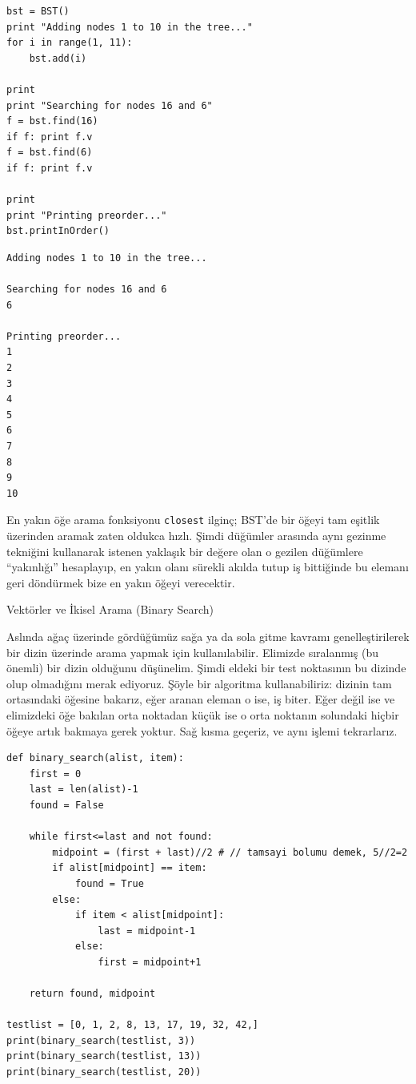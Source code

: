 \documentclass[12pt,fleqn]{article}\usepackage{../../common}
\begin{document}
\begin{verbatim}
bst = BST()
print "Adding nodes 1 to 10 in the tree..."
for i in range(1, 11):
    bst.add(i)

print
print "Searching for nodes 16 and 6"
f = bst.find(16)
if f: print f.v
f = bst.find(6)
if f: print f.v

print
print "Printing preorder..."
bst.printInOrder()
\end{verbatim}

\begin{verbatim}
Adding nodes 1 to 10 in the tree...

Searching for nodes 16 and 6
6

Printing preorder...
1 
2 
3 
4 
5 
6 
7 
8 
9 
10 
\end{verbatim}

En yakın öğe arama fonksiyonu \verb!closest! ilginç; BST'de bir öğeyi tam
eşitlik üzerinden aramak zaten oldukca hızlı. Şimdi düğümler arasında aynı
gezinme tekniğini kullanarak istenen yaklaşık bir değere olan o gezilen
düğümlere ``yakınlığı'' hesaplayıp, en yakın olanı sürekli akılda tutup iş
bittiğinde bu elemanı geri döndürmek bize en yakın öğeyi verecektir. 

Vektörler ve İkisel Arama (Binary Search)

Aslında ağaç üzerinde gördüğümüz sağa ya da sola gitme kavramı
genelleştirilerek bir dizin üzerinde arama yapmak için
kullanılabilir. Elimizde sıralanmış (bu önemli) bir dizin olduğunu
düşünelim. Şimdi eldeki bir test noktasının bu dizinde olup olmadığını
merak ediyoruz. Şöyle bir algoritma kullanabiliriz: dizinin tam ortasındaki
öğesine bakarız, eğer aranan eleman o ise, iş biter. Eğer değil ise ve
elimizdeki öğe bakılan orta noktadan küçük ise o orta noktanın solundaki
hiçbir öğeye artık bakmaya gerek yoktur. Sağ kısma geçeriz, ve aynı işlemi
tekrarlarız. 

\begin{verbatim}
def binary_search(alist, item):
    first = 0
    last = len(alist)-1
    found = False

    while first<=last and not found:
        midpoint = (first + last)//2 # // tamsayi bolumu demek, 5//2=2
        if alist[midpoint] == item:
            found = True
        else:
            if item < alist[midpoint]:
                last = midpoint-1
            else:
                first = midpoint+1

    return found, midpoint

testlist = [0, 1, 2, 8, 13, 17, 19, 32, 42,]
print(binary_search(testlist, 3))
print(binary_search(testlist, 13))
print(binary_search(testlist, 20))
\end{verbatim}
\end{document}
